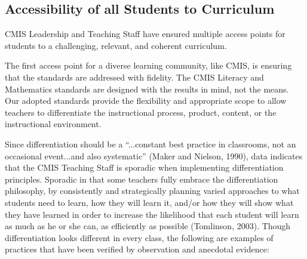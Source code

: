 \subsection{Accessibility of all Students to Curriculum}



\begin{findings}
CMIS Leadership and Teaching Staff have ensured multiple access points for students to a challenging, relevant, and coherent curriculum. 


The first access point for a diverse learning community, like CMIS, is ensuring that the standards are addressed with fidelity. The CMIS Literacy and Mathematics standards are designed with the results in mind, not the means. Our adopted standards provide the flexibility and appropriate scope to allow teachers to differentiate the instructional process, product, content, or the instructional environment. 

Since differentiation should be a “...constant best practice in classrooms, not an occasional event...and also systematic” (Maker and Nielson, 1990), data indicates that the CMIS Teaching Staff is sporadic when implementing differentiation principles. Sporadic in that some teachers fully embrace the differentiation philosophy, by consistently and strategically planning varied approaches to what students need to learn, how they will learn it, and/or how they will show what they have learned in order to increase the likelihood that each student will learn as much as he or she can, as efficiently as possible (Tomlinson, 2003). Though differentiation looks different in every class, the following are examples of practices that have been verified by observation and anecdotal evidence:
 

\end{findings}
